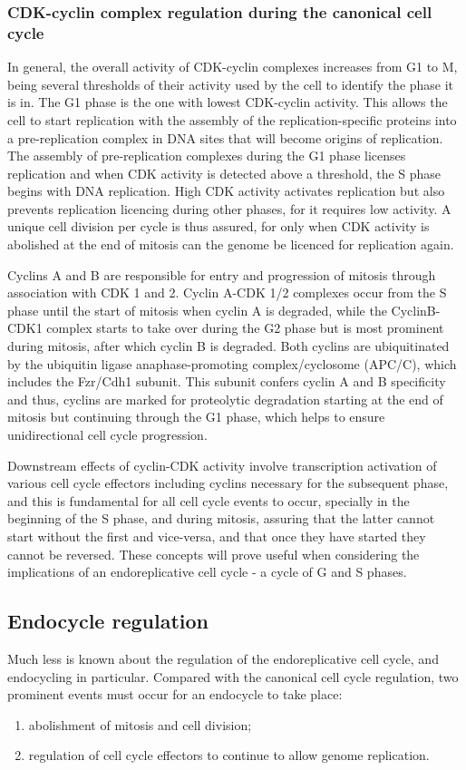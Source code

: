 \documentclass[11pt,twoside,a4paper]{report}
\begin{document}
				\subsubsection{CDK-cyclin complex regulation during the canonical cell cycle}
				In general, the overall activity of CDK-cyclin complexes increases from G1 to M, being several thresholds of their activity used by the cell to identify the phase it is in.
				The G1 phase is the one with lowest CDK-cyclin activity. This allows the cell to start replication with the assembly of the replication-specific proteins into a pre-replication complex in DNA sites that will become origins of replication. The assembly of pre-replication complexes during the G1 phase licenses replication and when CDK activity is detected above a threshold, the S phase begins with DNA replication. High CDK activity activates replication but also prevents replication licencing during other phases, for it requires low activity. A unique cell division per cycle is thus assured, for only when CDK activity is abolished at the end of mitosis can the genome be licenced for replication again.
				
				Cyclins A and B are responsible for entry and progression of mitosis through association with CDK 1 and 2. Cyclin A-CDK 1/2 complexes occur from the S phase until the start of mitosis when cyclin A is degraded, while the CyclinB-CDK1 complex starts to take over during the G2 phase but is most prominent during mitosis, after which cyclin B is degraded. Both cyclins are ubiquitinated by the ubiquitin ligase anaphase-promoting complex/cyclosome (APC/C), which includes the Fzr/Cdh1 subunit. This subunit confers cyclin A and B specificity and thus, cyclins are marked for proteolytic degradation starting at the end of mitosis but continuing through the G1 phase, which helps to ensure unidirectional cell cycle progression.	
			
				Downstream effects of cyclin-CDK activity involve transcription activation of various cell cycle effectors including cyclins necessary for the subsequent phase, and this is fundamental for all cell cycle events to occur, specially in the beginning of the S phase, and during mitosis, assuring that the latter cannot start without the first and vice-versa, and that once they have started they cannot be reversed. These concepts will prove useful when considering the implications of an endoreplicative cell cycle - a cycle of G and S phases.

			\subsection{Endocycle regulation}
			Much less is known about the regulation of the endoreplicative cell cycle, and endocycling in particular. Compared with the canonical cell cycle regulation, two prominent events must occur for an endocycle to take place:
			\begin{enumerate}
				\item abolishment of mitosis and cell division;
				\item regulation of cell cycle effectors to continue to allow genome replication.
			\end{enumerate}
						
\end{document}
